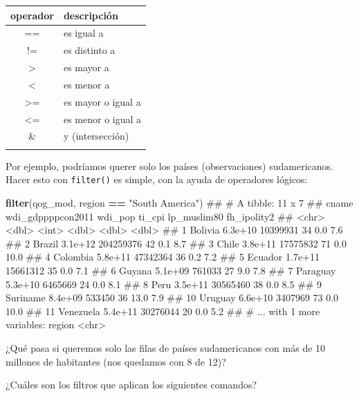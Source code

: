 \documentclass[]{book}
\newenvironment{Shaded}{\begin{snugshade}}{\end{snugshade}}
\newcommand{\KeywordTok}[1]{\textcolor[rgb]{0.13,0.29,0.53}{\textbf{#1}}}
\newcommand{\StringTok}[1]{\textcolor[rgb]{0.31,0.60,0.02}{#1}}
\newcommand{\OperatorTok}[1]{\textcolor[rgb]{0.81,0.36,0.00}{\textbf{#1}}}
\newcommand{\NormalTok}[1]{#1}
\begin{document}
\begin{longtable}[]{@{}cl@{}}
\toprule
operador & descripción\tabularnewline
\midrule
\endhead
== & es igual a\tabularnewline
!= & es distinto a\tabularnewline
\textgreater{} & es mayor a\tabularnewline
\textless{} & es menor a\tabularnewline
\textgreater{}= & es mayor o igual a\tabularnewline
\textless{}= & es menor o igual a\tabularnewline
\& & y (intersección)\tabularnewline
&\tabularnewline
\bottomrule
\end{longtable}

Por ejemplo, podríamos querer solo los países (observaciones)
sudamericanos. Hacer esto con \texttt{filter()} es simple, con la ayuda
de operadores lógicos:

\begin{Shaded}
\begin{Highlighting}[]
\KeywordTok{filter}\NormalTok{(qog_mod, region }\OperatorTok{==}\StringTok{ "South America"}\NormalTok{)}
\NormalTok{## # A tibble: 11 x 7}
\NormalTok{##        cname wdi_gdppppcon2011   wdi_pop ti_cpi lp_muslim80 fh_ipolity2}
\NormalTok{##        <chr>             <dbl>     <int>  <dbl>       <dbl>       <dbl>}
\NormalTok{##  1   Bolivia           6.3e+10  10399931     34         0.0         7.6}
\NormalTok{##  2    Brazil           3.1e+12 204259376     42         0.1         8.7}
\NormalTok{##  3     Chile           3.8e+11  17575832     71         0.0        10.0}
\NormalTok{##  4  Colombia           5.8e+11  47342364     36         0.2         7.2}
\NormalTok{##  5   Ecuador           1.7e+11  15661312     35         0.0         7.1}
\NormalTok{##  6    Guyana           5.1e+09    761033     27         9.0         7.8}
\NormalTok{##  7  Paraguay           5.3e+10   6465669     24         0.0         8.1}
\NormalTok{##  8      Peru           3.5e+11  30565460     38         0.0         8.5}
\NormalTok{##  9  Suriname           8.4e+09    533450     36        13.0         7.9}
\NormalTok{## 10   Uruguay           6.6e+10   3407969     73         0.0        10.0}
\NormalTok{## 11 Venezuela           5.4e+11  30276044     20         0.0         5.2}
\NormalTok{## # ... with 1 more variables: region <chr>}
\end{Highlighting}
\end{Shaded}

¿Qué pasa si queremos solo las filas de países sudamericanos con más de
10 millones de habitantes (nos quedamos con 8 de 12)?

¿Cuáles son los filtros que aplican los siguientes comandos?
\end{document}
